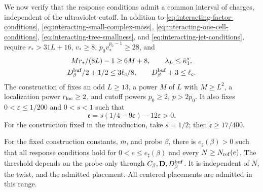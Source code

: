 \documentclass[11pt,letterpaper,reqno]{amsart}
\begin{document}
We now verify that the response conditions admit
a common interval of charges, independent of the
ultraviolet cutoff. In addition to
\eqref{eq:interacting-factor-conditions},
\eqref{eq:interacting-small-complex-mass},
\eqref{eq:interacting-one-cell-conditions},
\eqref{eq:interacting-tree-smallness}, and
\eqref{eq:interacting-jet-conditions}, require
$r_*>31L+16$, $v_*\ge8$, $p_0v_*^{p_0-1}\ge28$, and
\begin{gather}
 Mr_*/(8L)-1\ge6M+8,\qquad
 \lambda_L\le\bar\kappa_1^s,
                                  \label{eq:interacting-last-response-conditions}\\
 D_\beta^{\rm buf}/2+1/2\le3\ell_c/8,\qquad
 D_\beta^{\rm buf}+3\le\ell_c .
                                  \label{eq:interacting-placement-conditions}
\end{gather}
The construction of \cite[\S6.1]{CoverTuning}
fixes an odd $L\ge13$, a power
$M$ of $L$ with $M\ge L^2$, a localization
power $r_{\rm loc}\ge2$, and cutoff powers
$p_0\ge2$, $p>2p_0$. It also fixes
$0<\varepsilon\le1/200$ and $0<s<1$ such that
\begin{equation}\label{eq:interacting-response-exponents}
 \mathfrak e=s(1/4-9\varepsilon)-12\varepsilon>0.
\end{equation}
For the construction fixed in the introduction, take $s=1/2$;
then $\mathfrak e\ge17/400$.

\begin{proposition}\label{prop:interacting-positive-threshold}
For the fixed construction constants, $\bar m$,
and probe $\beta$, there is $e_\sharp(\beta)>0$
such that all response conditions hold for
$0<e\le e_\sharp(\beta)$ and every
$N\ge N_{\rm ref}(e)$. The threshold depends
on the probe only through
$C_\beta,\mathbf D,D_\beta^{\rm buf}$.
It is independent of $N$, the twist, and the
admitted placement. All centered placements
are admitted in this range.
\end{proposition}
\end{document}
